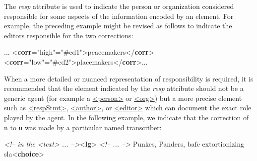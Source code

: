 The {\itshape resp} attribute is used to indicate the person or organization considered responsible for some aspects of the information encoded by an element. For example, the preceding example might be revised as follows to indicate the editors responsible for the two corrections: \par\bgroup{}\exampleFont \begin{shaded}\noindent\mbox{} ... {<\textbf{corr}\hspace*{1em}{cert}="{high}"\hspace*{1em}{resp}="{\#ed1}">}peacemakers{</\textbf{corr}>}\mbox{}\newline 
{<\textbf{corr}\hspace*{1em}{cert}="{low}"\hspace*{1em}{resp}="{\#ed2}">}placemakers{</\textbf{corr}>}...\end{shaded}\egroup\par \noindent  When a more detailed or nuanced representation of responsibility is required, it is recommended that the element indicated by the {\itshape resp} attribute should not be a generic agent (for example a \hyperref[TEI.person]{<person>} or \hyperref[TEI.org]{<org>}) but a more precise element such as \hyperref[TEI.respStmt]{<respStmt>}, \hyperref[TEI.author]{<author>}, or \hyperref[TEI.editor]{<editor>} which can document the exact role played by the agent. In the following example, we indicate that the correction of n to u was made by a particular named transcriber: \par\bgroup{}\exampleFont \begin{shaded}\noindent\mbox{}\mbox{}\newline 
\textit{<!-- in the <text> ... -->}{<\textbf{lg}>}\mbox{}\newline 
\textit{<!-- ... -->}\mbox{}\newline 
{}Punkes, Panders, baſe extortionizing\mbox{}\newline 
\hspace*{1em}\hspace*{1em} sla{<\textbf{choice}>}\mbox{}\newline 

\end{shaded}
